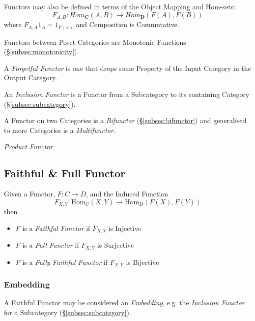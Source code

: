 Functors may also be defined in terms of the Object Mapping and Hom-sets:
\[
    F_{A,B} : Hom_{\mathbf{C}}(A,B) \rightarrow Hom_{\mathbf{D}}(F(A),F(B))
\]
where $F_{A,A}1_A = 1_{F(A)}$ and Composition is Commutative.

Functors between Poset Categories are Monotonic Functions
(\S\ref{subsec:monotonicity}).

A \emph{Forgetful Functor} is one that drops some Property of the
Input Category in the Output Category.

An \emph{Inclusion Functor} is a Functor from a Subcategory to its
containing Category (\S\ref{subsec:subcategory}).

A Functor on two Categories is a \emph{Bifunctor}
(\S\ref{subsec:bifunctor}) and generalised to more Categories is a
\emph{Multifunctor}.

\emph{Product Functor}



\subsection{Faithful \& Full Functor}\label{subsec:faithful_functor}

Given a Functor, $F : C \rightarrow D$, and the Induced Function
\[
    F_{X,Y} : \mathrm{Hom}_C(X,Y) \rightarrow \mathrm{Hom}_D(F(X),F(Y))
\]
then
\begin{itemize}
    \item $F$ is a \emph{Faithful Functor} if $F_{X,Y}$ is Injective
    \item $F$ is a \emph{Full Functor} if $F_{X,Y}$ is Surjective
    \item $F$ is a \emph{Fully Faithful Functor} if $F_{X,Y}$ is
      Bijective
\end{itemize}



\subsubsection{Embedding}\label{subsec:category_embedding}

A Faithful Functor may be considered an \emph{Embedding}, e.g. the
\emph{Inclusion Functor} for a Subcategory
(\S\ref{subsec:subcategory}).




